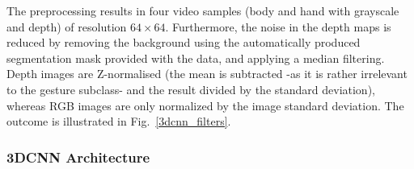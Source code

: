 The preprocessing results in four video samples (body and hand with grayscale and depth) of resolution $64\times64$.
Furthermore, the noise in the depth maps is reduced by removing the background using the automatically produced
segmentation mask provided with the data, and applying a  median filtering.
%
Depth images are Z-normalised (the mean is subtracted -as it is rather irrelevant to the gesture subclass-
and the result divided by the standard deviation), whereas
RGB images are only normalized by the image standard deviation.
The outcome is illustrated in Fig.~\ref{3dcnn_filters}.


\subsubsection{3DCNN Architecture}


